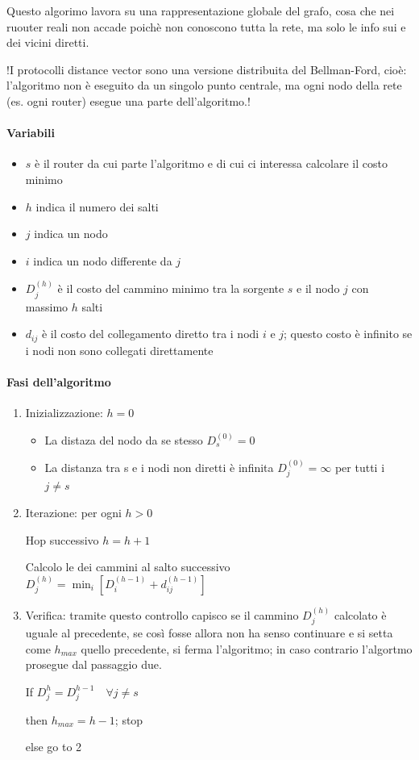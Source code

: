 Questo algorimo lavora su una rappresentazione globale del grafo, cosa che nei ruouter reali non accade poichè non conoscono tutta la rete, ma solo le info sui e dei vicini diretti.

!I protocolli distance vector sono una versione distribuita del Bellman-Ford, cioè: l'algoritmo non è eseguito da un singolo punto centrale, ma ogni nodo della rete (es. ogni router) esegue una parte dell'algoritmo.!


\paragraph{Variabili}
\begin{multicols}{2}
\begin{itemize}
    \item $s$ è il router da cui parte l'algoritmo e di cui ci interessa calcolare il costo minimo
    \item $h$ indica il numero dei salti
    \item $j$ indica un nodo
    \item $i$ indica un nodo differente da $j$
    \item $D_j^{(h)}$ è il costo del cammino minimo tra la sorgente $s$ e il nodo $j$ con massimo $h$ salti
    \item $d_{ij}$ è il costo del collegamento diretto tra i nodi $i$ e $j$; questo costo è infinito se i nodi non sono collegati direttamente
\end{itemize}
\end{multicols}



\paragraph{Fasi dell'algoritmo}
\begin{enumerate}
    \item Inizializzazione: $h = 0$
    \begin{itemize}
        \item La distaza del nodo da se stesso $D_s^{(0)} = 0$
        \item La distanza tra s e i nodi non diretti è infinita $D_j^{(0)} = \infty$ per tutti i $j \neq s$
    \end{itemize}
    \item Iterazione: per ogni $h > 0$

    Hop successivo $h = h + 1$ 

    Calcolo le dei cammini al salto successivo $D_j^{(h)} = \min_i [D_i^{(h-1)} + d_{ij}^{(h-1)}]$

     \item Verifica: tramite questo controllo capisco se il cammino $D_j^{(h)}$ calcolato è uguale al precedente, se così fosse allora non ha senso continuare e si setta come $h_{max}$ quello precedente, si ferma l'algoritmo; in caso contrario l'algortmo prosegue dal passaggio due. 
     
    If $D_j^{h} = D_j^{h-1} \quad \forall j \neq s$
    
    then $h_{max} = h - 1$; stop
    
    else go to 2
\end{enumerate}
\newpage
